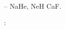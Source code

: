 \documentclass[a4paper]{article}
\begin{document}
{\CYRC}{\cyre}{\cyrl}{\cyrsftsn} {\cyrr}{\cyra}{\cyrb}{\cyro}{\cyrt}{\cyrery} --
{\cyrr}{\cyra}{\cyrs}{\cyrch}{\cyre}{\cyrt} {\cyrs}{\cyri}{\cyrl}
{\cyro}{\cyrs}{\cyrc}{\cyri}{\cyrl}{\cyrl}{\cyrya}{\cyrt}{\cyro}{\cyrr}{\cyro}{\cyrv} {\cyrd}{\cyrl}{\cyrya}
{\cyrm}{\cyro}{\cyrl}{\cyre}{\cyrk}{\cyru}{\cyrl} \foreignlanguage{english}{NaHe}, \foreignlanguage{english}{NeH}
{\cyri} \foreignlanguage{english}{CaF}. 

{\CYRV} {\cyrr}{\cyra}{\cyrm}{\cyrk}{\cyra}{\cyrh} {\cyrd}{\cyra}{\cyrn}{\cyrn}{\cyro}{\cyrishrt}
{\cyrc}{\cyre}{\cyrl}{\cyri} {\cyrm}{\cyro}{\cyrzh}{\cyrn}{\cyro}
{\cyrv}{\cyrery}{\cyrd}{\cyre}{\cyrl}{\cyri}{\cyrt}{\cyrsftsn}
{\cyrs}{\cyrl}{\cyre}{\cyrd}{\cyru}{\cyryu}{\cyrshch}{\cyri}{\cyre}
{\cyrk}{\cyro}{\cyrn}{\cyrk}{\cyrr}{\cyre}{\cyrt}{\cyrn}{\cyrery}{\cyre} {\cyrz}{\cyra}{\cyrd}{\cyra}{\cyrch}{\cyri}: 
\end{document}
